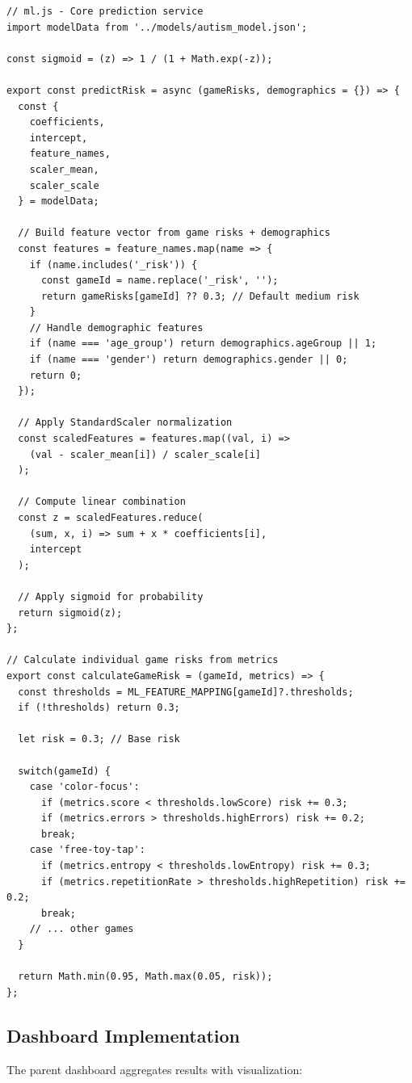 \documentclass[12pt,letterpaper]{article}
\begin{document}
\begin{verbatim}
// ml.js - Core prediction service
import modelData from '../models/autism_model.json';

const sigmoid = (z) => 1 / (1 + Math.exp(-z));

export const predictRisk = async (gameRisks, demographics = {}) => {
  const { 
    coefficients, 
    intercept, 
    feature_names,
    scaler_mean, 
    scaler_scale 
  } = modelData;
  
  // Build feature vector from game risks + demographics
  const features = feature_names.map(name => {
    if (name.includes('_risk')) {
      const gameId = name.replace('_risk', '');
      return gameRisks[gameId] ?? 0.3; // Default medium risk
    }
    // Handle demographic features
    if (name === 'age_group') return demographics.ageGroup || 1;
    if (name === 'gender') return demographics.gender || 0;
    return 0;
  });
  
  // Apply StandardScaler normalization
  const scaledFeatures = features.map((val, i) => 
    (val - scaler_mean[i]) / scaler_scale[i]
  );
  
  // Compute linear combination
  const z = scaledFeatures.reduce(
    (sum, x, i) => sum + x * coefficients[i], 
    intercept
  );
  
  // Apply sigmoid for probability
  return sigmoid(z);
};

// Calculate individual game risks from metrics
export const calculateGameRisk = (gameId, metrics) => {
  const thresholds = ML_FEATURE_MAPPING[gameId]?.thresholds;
  if (!thresholds) return 0.3;
  
  let risk = 0.3; // Base risk
  
  switch(gameId) {
    case 'color-focus':
      if (metrics.score < thresholds.lowScore) risk += 0.3;
      if (metrics.errors > thresholds.highErrors) risk += 0.2;
      break;
    case 'free-toy-tap':
      if (metrics.entropy < thresholds.lowEntropy) risk += 0.3;
      if (metrics.repetitionRate > thresholds.highRepetition) risk += 0.2;
      break;
    // ... other games
  }
  
  return Math.min(0.95, Math.max(0.05, risk));
};
\end{verbatim}

\subsection{Dashboard Implementation}

The parent dashboard aggregates results with visualization:
\end{document}
